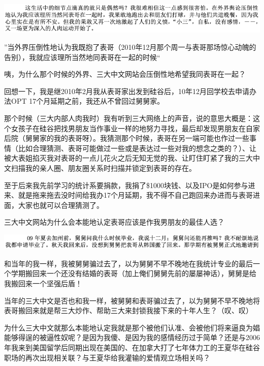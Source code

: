 \documentclass[9pt, b5paper]{article}
\begin{document}
\begin{center}
\includegraphics[width=.9\linewidth]{./pic/p1p46-2.png}
\end{center}

”当外界压倒性地认为我既抱了表哥（2010年12月那个周一与表哥那场惊心动魄的告别），我就应该理所当然地同表哥在一起的时候“

咦，为什么那个时候的外界、三大中文网站会压倒性地希望我同表哥在一起？

回想一下，我是继2010年2月我从表哥家出发到硅谷后，10年12月回学校去申请办法OPT 17个月延期之前，我还从不曾回过舅舅家。 

那个时候（三大内部人肉我时）我有听到三大网络上的声音，说的意思大概是：这个女孩子在硅谷把找男朋友当作事业一样的地努力寻找，最后却发现男朋友在自家后院（舅舅家的我的表哥呀）。我猜测那个时候，表哥在另一端可能也作过一些事情（比如合理猜测、表哥可能做过一些或是表达过一些对我的想念之类的？）、让被大表姐掐灭我对表哥的一点儿花火之后无知无觉的我、让盯住盯紧了我的三大中文扫描我的亲人圈、朋友圈关系时扫描并锁定到表哥的存在。

至于后来我先前学习的统计系要捐款，我捐了\$1000块钱、以及IPO是如何参与进来、就是拖来拖去没时间给我办17个月延期，我不得不自己跑回来办进而与表哥进面，大家也就可以合理猜测了。 

三大中文网站为什么会本能地认定表哥应该是作我男朋友的最佳人选？

\begin{center}
\includegraphics[width=.9\linewidth]{./pic/p1p39-2.png}
\end{center}

和当年的我一样，我被舅舅骗过去了，以为舅舅不早不晚地在我统计专业的最后一个学期搬回来一个还没有结婚的表哥（加上俺们舅舅先前的屡屡神话），舅舅是给我搬回来一个坚强后盾！

当年的三大中文是否也和我一样，被舅舅和表哥骗过去了，以为舅舅不早不晚地将表哥搬回来就是帮三大炒作、帮助三大来封锁我接下来的十年人生？（叹、叹）

为什么三大中文就那么本能地认定我就是那个被他们认准、会被他们将来逼良为娼能够得逞的被逼性奴呢？是因为我傻、是因为我的感情经历过于简单？还是与2006年我来到美国留学后同期出现在美国的、在加拿大打了七年体力工的王夏华在硅谷职场的再次出现相关联？与王夏华给我灌输的爱情观立场相关吗？
\end{document}
